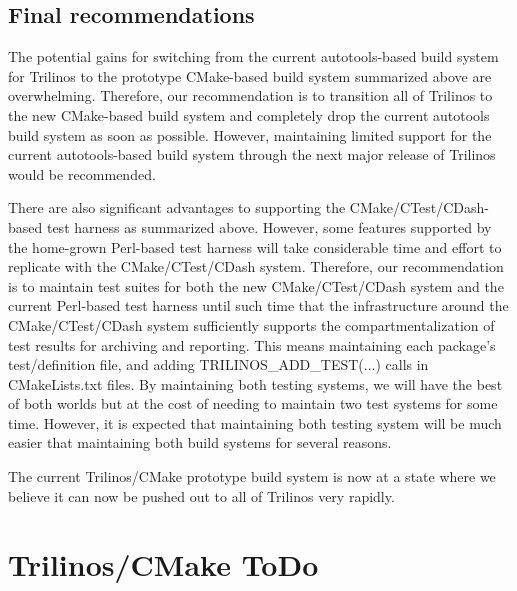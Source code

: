 \documentclass[pdf,ps2pdf,11pt]{SANDreport}
\begin{document}
%
\subsection{Final recommendations}
%

The potential gains for switching from the current autotools-based build
system for Trilinos to the prototype CMake-based build system
summarized above are overwhelming.  Therefore, our recommendation is
to transition all of Trilinos to the new CMake-based build system and
completely drop the current autotools build system as soon as
possible.  However, maintaining limited support for the current
autotools-based build system through the next major release of
Trilinos would be recommended.

There are also significant advantages to supporting the
CMake/CTest/CDash-based test harness as summarized above.  However,
some features supported by the home-grown Perl-based test harness will
take considerable time and effort to replicate with the
CMake/CTest/CDash system.  Therefore, our recommendation is to
maintain test suites for both the new CMake/CTest/CDash system and the
current Perl-based test harness until such time that the
infrastructure around the CMake/CTest/CDash system sufficiently
supports the compartmentalization of test results for archiving and
reporting.  This means maintaining each package's test/definition file,
and adding TRILINOS\_ADD\_TEST(...) calls in CMakeLists.txt files.  By
maintaining both testing systems, we will have the best of both worlds
but at the cost of needing to maintain two test systems for some time.
However, it is expected that maintaining both testing system will be
much easier that maintaining both build systems for several reasons.

The current Trilinos/CMake prototype build system is now at a state
where we believe it can now be pushed out to all of Trilinos very
rapidly.


%
\clearpage




%
\appendix



%
\section{Trilinos/CMake ToDo}
%
\end{document}
